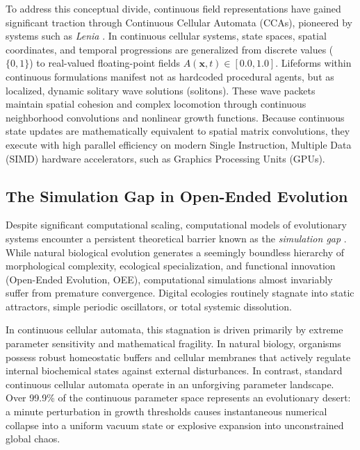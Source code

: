 To address this conceptual divide, continuous field representations have gained significant traction through Continuous Cellular Automata (CCAs), pioneered by systems such as \textit{Lenia} \parencite{chan2019lenia, chan2020lenia}. In continuous cellular systems, state spaces, spatial coordinates, and temporal progressions are generalized from discrete values ($\{0, 1\}$) to real-valued floating-point fields $A(\mathbf{x}, t) \in [0.0, 1.0]$. Lifeforms within continuous formulations manifest not as hardcoded procedural agents, but as localized, dynamic solitary wave solutions (solitons). These wave packets maintain spatial cohesion and complex locomotion through continuous neighborhood convolutions and nonlinear growth functions. Because continuous state updates are mathematically equivalent to spatial matrix convolutions, they execute with high parallel efficiency on modern Single Instruction, Multiple Data (SIMD) hardware accelerators, such as Graphics Processing Units (GPUs).

\subsection{The Simulation Gap in Open-Ended Evolution}
\label{subsec:intro_simulation_gap}

Despite significant computational scaling, computational models of evolutionary systems encounter a persistent theoretical barrier known as the \textit{simulation gap} \parencite{taylor2016open}. While natural biological evolution generates a seemingly boundless hierarchy of morphological complexity, ecological specialization, and functional innovation (Open-Ended Evolution, OEE), computational simulations almost invariably suffer from premature convergence. Digital ecologies routinely stagnate into static attractors, simple periodic oscillators, or total systemic dissolution.

In continuous cellular automata, this stagnation is driven primarily by extreme parameter sensitivity and mathematical fragility. In natural biology, organisms possess robust homeostatic buffers and cellular membranes that actively regulate internal biochemical states against external disturbances. In contrast, standard continuous cellular automata operate in an unforgiving parameter landscape. Over 99.9\% of the continuous parameter space represents an evolutionary desert: a minute perturbation in growth thresholds causes instantaneous numerical collapse into a uniform vacuum state or explosive expansion into unconstrained global chaos.

